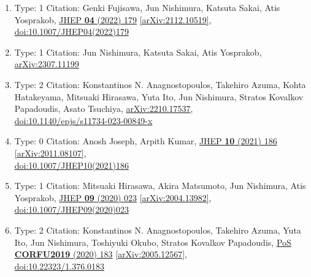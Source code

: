 \documentclass[a4paper,10pt]{article}
\begin{document}
\begin{enumerate}
\begin{enumerate}
  \item Type: 1 Citation: Genki Fujisawa, Jun Nishimura, Katsuta Sakai, Atis Yosprakob, \href{https://www.doi.org/10.1007/JHEP04(2022)179}{JHEP {\bf 04} (2022) 179}  \href{https://arxiv.org/abs/2112.10519}{[arXiv:2112.10519]},\\\href{https://www.doi.org/10.1007/JHEP04(2022)179}{doi:10.1007/JHEP04(2022)179}
  \item Type: 1 Citation: Jun Nishimura, Katsuta Sakai, Atis Yosprakob, \href{https://arxiv.org/abs/2307.11199}{arXiv:2307.11199}
  \item Type: 2 Citation: Konstantinos N. Anagnostopoulos, Takehiro Azuma, Kohta Hatakeyama, Mitsuaki Hirasawa, Yuta Ito, Jun Nishimura, Stratos Kovalkov Papadoudis, Asato Tsuchiya, \href{https://arxiv.org/abs/2210.17537}{arXiv:2210.17537},\\\href{https://www.doi.org/10.1140/epjs/s11734-023-00849-x}{doi:10.1140/epjs/s11734-023-00849-x}
  \item Type: 0 Citation: Anosh Joseph, Arpith Kumar, \href{https://www.doi.org/10.1007/JHEP10(2021)186}{JHEP {\bf 10} (2021) 186}  \href{https://arxiv.org/abs/2011.08107}{[arXiv:2011.08107]},\\\href{https://www.doi.org/10.1007/JHEP10(2021)186}{doi:10.1007/JHEP10(2021)186}
  \item Type: 1 Citation: Mitsuaki Hirasawa, Akira Matsumoto, Jun Nishimura, Atis Yosprakob, \href{https://www.doi.org/10.1007/JHEP09(2020)023}{JHEP {\bf 09} (2020) 023}  \href{https://arxiv.org/abs/2004.13982}{[arXiv:2004.13982]},\\\href{https://www.doi.org/10.1007/JHEP09(2020)023}{doi:10.1007/JHEP09(2020)023}
  \item Type: 2 Citation: Konstantinos N. Anagnostopoulos, Takehiro Azuma, Yuta Ito, Jun Nishimura, Toshiyuki Okubo, Stratos Kovalkov Papadoudis, \href{https://www.doi.org/10.22323/1.376.0183}{PoS {\bf CORFU2019} (2020) 183}  \href{https://arxiv.org/abs/2005.12567}{[arXiv:2005.12567]},\\\href{https://www.doi.org/10.22323/1.376.0183}{doi:10.22323/1.376.0183}

\end{enumerate}
\end{enumerate}
\end{document}
